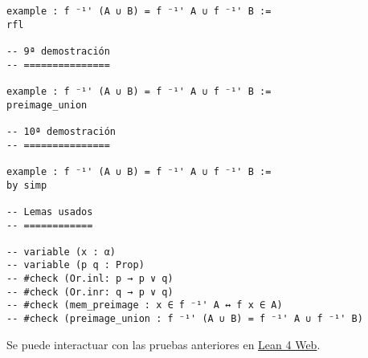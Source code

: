 \begin{verbatim}
example : f ⁻¹' (A ∪ B) = f ⁻¹' A ∪ f ⁻¹' B :=
rfl

-- 9ª demostración
-- ===============

example : f ⁻¹' (A ∪ B) = f ⁻¹' A ∪ f ⁻¹' B :=
preimage_union

-- 10ª demostración
-- ===============

example : f ⁻¹' (A ∪ B) = f ⁻¹' A ∪ f ⁻¹' B :=
by simp

-- Lemas usados
-- ============

-- variable (x : α)
-- variable (p q : Prop)
-- #check (Or.inl: p → p ∨ q)
-- #check (Or.inr: q → p ∨ q)
-- #check (mem_preimage : x ∈ f ⁻¹' A ↔ f x ∈ A)
-- #check (preimage_union : f ⁻¹' (A ∪ B) = f ⁻¹' A ∪ f ⁻¹' B)
\end{verbatim}
Se puede interactuar con las pruebas anteriores en \href{https://lean.math.hhu.de/\#url=https://raw.githubusercontent.com/jaalonso/Calculemus2/main/src/Imagen\_inversa\_de\_la\_union.lean}{Lean 4 Web}.

